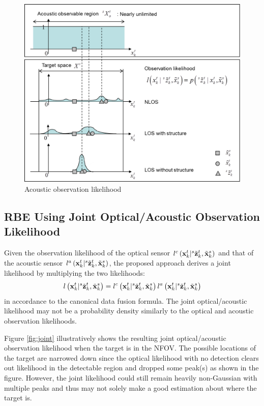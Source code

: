 \begin{figure}[ht]
	\centering
	\includegraphics[width = \columnwidth]{acoustic.png} %
	\caption{Acoustic observation likelihood}
	\label{fig:acoustic}
\end{figure}

\subsection{RBE Using Joint Optical/Acoustic Observation Likelihood}
Given the observation likelihood of the optical sensor $l^{c} \left ( \mathbf{x}_{k}^{t}|{}^{s}\tilde {\mathbf{z}}_{k}^{t},\tilde {\mathbf{x}}_{k}^{s} \right )$ and that of the acoustic sensor \linebreak[4] $l^{a} \left ( \mathbf{x}_{k}^{t}|{}^{s}\tilde {\mathbf{z}}_{k}^{t},\tilde {\mathbf{x}}_{k}^{s} \right )$, the proposed approach derives a joint likelihood by multiplying the two likelihoods: 
\begin{equation}\label{eq:joint}
l \left ( \mathbf{x}_{k}^{t}|{}^{s}\tilde {\mathbf{z}}_{k}^{t},\tilde {\mathbf{x}}_{k}^{s} \right ) = l^{c} \left ( \mathbf{x}_{k}^{t}|{}^{s}\tilde {\mathbf{z}}_{k}^{t},\tilde {\mathbf{x}}_{k}^{s} \right ) l^{a} \left ( \mathbf{x}_{k}^{t}|{}^{s}\tilde {\mathbf{z}}_{k}^{t},\tilde {\mathbf{x}}_{k}^{s} \right ) 
\end{equation}
in accordance to the canonical data fusion formula.  The joint optical/acoustic likelihood may not be a probability density similarly to the optical and acoustic observation likelihoods. 

Figure \ref{fig:joint} illustratively shows the resulting joint optical/acoustic observation likelihood when the target is in the NFOV.  The possible locations of the target are narrowed down since the optical likelihood with no detection clears out likelihood in the detectable region and dropped some peak(s) as shown in the figure.  However, the joint likelihood could still remain heavily non-Gaussian with multiple peaks and thus may not solely make a good estimation about where the target is.  


